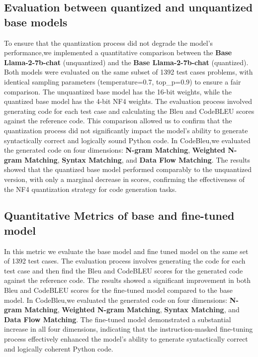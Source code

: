 \subsection{Evaluation between quantized and unquantized base models}
To ensure that the quantization process did not degrade the model's performance,we implemented a quantitative comparison between the \textbf{Base Llama-2-7b-chat} (unquantized) and the \textbf{Base Llama-2-7b-chat} (quantized). Both models were evaluated on the same subset of 1392 test cases problems, with identical sampling parameters (temperature=0.7, top\_p=0.9) to ensure a fair comparison.
The unquantized base model has the 16-bit weights, while the quantized base model has the 4-bit NF4 weights. The evaluation process involved generating code for each test case and calculating the Bleu and CodeBLEU scores against the reference code. This comparison allowed us to confirm that the quantization process did not significantly impact the model's ability to generate syntactically correct and logically sound Python code.
In CodeBleu,we evaluated the generated code on four dimensions: \textbf{N-gram Matching}, \textbf{Weighted N-gram Matching}, \textbf{Syntax Matching}, and \textbf{Data Flow Matching}. The results showed that the quantized base model performed comparably to the unquantized version, with only a marginal decrease in scores, confirming the effectiveness of the NF4 quantization strategy for code generation tasks.

\subsection{Quantitative Metrics of base and fine-tuned model}
In this metric we evaluate the base model and fine tuned model on the same set of 1392 test cases. The evaluation process involves generating the code for each test case and then find the Bleu and CodeBLEU scores for the generated code against the reference code.
The results showed a significant improvement in both Bleu and CodeBLEU scores for the fine-tuned model compared to the base model. In CodeBleu,we evaluated the generated code on four dimensions: \textbf{N-gram Matching}, \textbf{Weighted N-gram Matching}, \textbf{Syntax Matching}, and \textbf{Data Flow Matching}. The fine-tuned model demonstrated a substantial increase in all four dimensions, indicating that the instruction-masked fine-tuning process effectively enhanced the model's ability to generate syntactically correct and logically coherent Python code.

